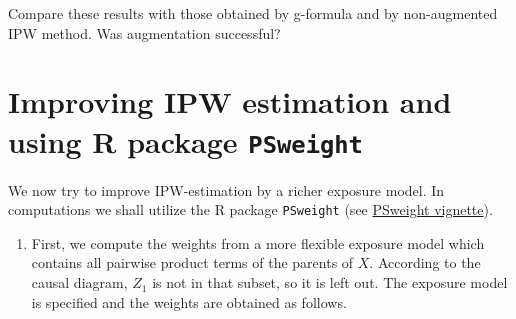 \documentclass[
]{book}
\newenvironment{Shaded}{\begin{snugshade}}{\end{snugshade}}
\newcommand{\DecValTok}[1]{\textcolor[rgb]{0.00,0.00,0.81}{#1}}
\newcommand{\DocumentationTok}[1]{\textcolor[rgb]{0.56,0.35,0.01}{\textbf{\textit{#1}}}}
\newcommand{\FunctionTok}[1]{\textcolor[rgb]{0.13,0.29,0.53}{\textbf{#1}}}
\newcommand{\NormalTok}[1]{#1}
\newcommand{\OtherTok}[1]{\textcolor[rgb]{0.56,0.35,0.01}{#1}}
\newcommand{\SpecialCharTok}[1]{\textcolor[rgb]{0.81,0.36,0.00}{\textbf{#1}}}
\providecommand{\tightlist}{%
  \setlength{\itemsep}{0pt}\setlength{\parskip}{0pt}}
\begin{document}
\begin{Shaded}
\end{Shaded}

Compare these results with those obtained by g-formula and by
non-augmented IPW method.
Was augmentation successful?

\section{\texorpdfstring{Improving IPW estimation and using R package \texttt{PSweight}}{Improving IPW estimation and using R package PSweight}}\label{improving-ipw-estimation-and-using-r-package-psweight}

We now try to improve IPW-estimation by a richer exposure model.
In computations we shall utilize the R package \texttt{PSweight}
(see \href{https://cran.r-project.org/web/packages/PSweight/vignettes/vignette.pdf}{PSweight vignette}).

\begin{enumerate}
\def\labelenumi{\arabic{enumi}.}
\tightlist
\item
  First, we compute the weights from a more flexible exposure model which
  contains all pairwise product terms of the parents of \(X\).
  According to the causal diagram, \(Z_1\) is not in that subset, so it is left out.
  The exposure model is specified and the weights are obtained as follows.
\end{enumerate}
\end{document}
